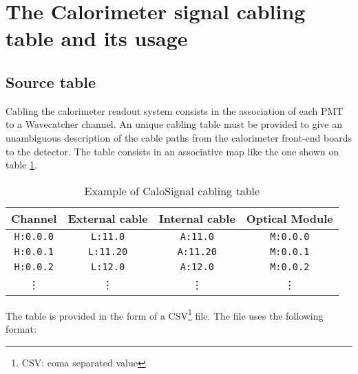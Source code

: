 
\section{The Calorimeter signal cabling table and its usage}

\subsection{Source table}

Cabling the calorimeter readout system  consists in the association of
each PMT  to a Wavecatcher channel.   An unique cabling table  must be
provided to  give an unambiguous  description of the cable  paths from
the calorimeter front-end boards to  the detector.  The table consists
in   an    associative   map   like    the   one   shown    on   table
\ref{tab:calosignal:map:1}.

\begin{table}[h]
\begin{center}
\begin{tabular}{|c|c|c|c|}
  \hline
  \textbf{Channel}& \textbf{External cable} & \textbf{Internal cable} & \textbf{Optical Module} \\
  \hline
  \hline
  \texttt{H:0.0.0}   & \texttt{L:11.0}   & \texttt{A:11.0}   & \texttt{M:0.0.0}   \\
  \hline
  \texttt{H:0.0.1}   & \texttt{L:11.20}  & \texttt{A:11.20}  & \texttt{M:0.0.1}   \\
  \hline
  \texttt{H:0.0.2}   & \texttt{L:12.0}   & \texttt{A:12.0}   & \texttt{M:0.0.2}   \\
  \hline
  \vdots             & \vdots            &  \vdots           & \vdots             \\  
  \hline
\end{tabular}
\end{center}
\caption{Example of CaloSignal cabling table}
\label{tab:calosignal:map:1}
\end{table}

\par\noindent The table is provided in the form of a CSV\footnote{CSV:
  coma separated value} file.  The file uses the following format:

